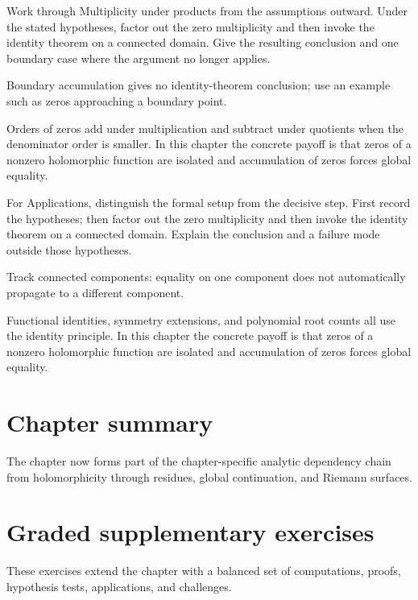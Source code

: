 \begin{exercise}\label{exr:iv07-07}
Work through Multiplicity under products from the assumptions outward. Under the stated hypotheses, factor out the zero multiplicity and then invoke the identity theorem on a connected domain. Give the resulting conclusion and one boundary case where the argument no longer applies.
\end{exercise}
\begin{hint}
Boundary accumulation gives no identity-theorem conclusion; use an example such as zeros approaching a boundary point.
\end{hint}
\begin{solution}
Orders of zeros add under multiplication and subtract under quotients when the denominator order is smaller. In this chapter the concrete payoff is that zeros of a nonzero holomorphic function are isolated and accumulation of zeros forces global equality.
\end{solution}

\begin{exercise}\label{exr:iv07-08}
For Applications, distinguish the formal setup from the decisive step. First record the hypotheses; then factor out the zero multiplicity and then invoke the identity theorem on a connected domain. Explain the conclusion and a failure mode outside those hypotheses.
\end{exercise}
\begin{hint}
Track connected components: equality on one component does not automatically propagate to a different component.
\end{hint}
\begin{solution}
Functional identities, symmetry extensions, and polynomial root counts all use the identity principle. In this chapter the concrete payoff is that zeros of a nonzero holomorphic function are isolated and accumulation of zeros forces global equality.
\end{solution}

\section*{Chapter summary}
The chapter now forms part of the chapter-specific analytic dependency chain from holomorphicity through residues, global continuation, and Riemann surfaces.
\section{Graded supplementary exercises}
These exercises extend the chapter with a balanced set of computations, proofs, hypothesis tests, applications, and challenges.

